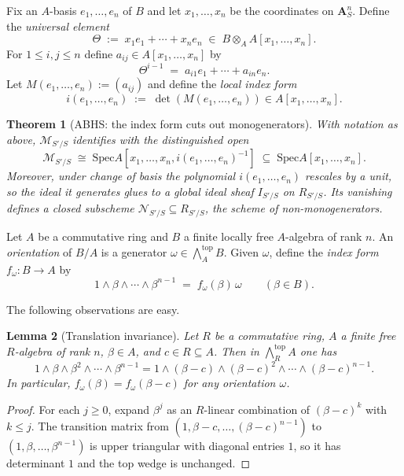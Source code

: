 \documentclass[11pt,letterpaper]{amsart}
\newcommand{\A}{\mathbf{A}}
\newcommand{\Spec}{\mathrm{Spec}}
\newcommand{\wedgeTop}{\bigwedge\nolimits^{\mathrm{top}}}
\newcommand{\cM}{\mathcal{M}}
\newcommand{\cN}{\mathcal{N}}
\theoremstyle{plain}
\newtheorem{theorem}{Theorem}[section]
\newtheorem{lemma}[theorem]{Lemma}
\theoremstyle{definition}
\theoremstyle{remark}
\theoremstyle{plain}
\begin{document}
Fix an $A$-basis $e_1,\dots,e_n$ of $B$ and let $x_1,\dots,x_n$ be the coordinates on $\A^n_S$.
Define the \emph{universal element}
\[
\Theta \;:=\; x_1 e_1 + \cdots + x_n e_n \;\in\; B\otimes_A A[x_1,\dots,x_n].
\]
For $1\le i,j\le n$ define $a_{ij}\in A[x_1,\dots,x_n]$ by
\[
\Theta^{i-1} \;=\; a_{i1}e_1 + \cdots + a_{in}e_n.
\]
Let $M(e_1,\dots,e_n):=(a_{ij})$ and define the \emph{local index form}
\[
i(e_1,\dots,e_n) \;:=\; \det(M(e_1,\dots,e_n)) \in A[x_1,\dots,x_n].
\]

\begin{theorem}[ABHS: the index form cuts out monogenerators]\label{thm:ABHS-index-open}
With notation as above, $\cM_{S'/S}$ identifies with the distinguished open
\[
\cM_{S'/S} \;\cong\; \Spec A[x_1,\dots,x_n, i(e_1,\dots,e_n)^{-1} ] \;\subseteq\; \Spec A[x_1,\dots,x_n].
\]
Moreover, under change of basis the polynomial $i(e_1,\dots,e_n)$ rescales by a unit, so the ideal it
generates glues to a global ideal sheaf $I_{S'/S}$ on $R_{S'/S}$.
Its vanishing defines a closed subscheme $\cN_{S'/S}\subseteq R_{S'/S}$, the \emph{scheme of non-monogenerators}.
\end{theorem}


Let $A$ be a commutative ring and $B$ a finite locally free $A$-algebra of rank $n$.
An \emph{orientation} of $B/A$ is a generator $\omega \in \wedgeTop_A B$.
Given $\omega$, define the \emph{index form} $f_\omega:B\to A$ by
\begin{equation}\label{eq:index-form-algebra}
1\wedge \beta \wedge \cdots \wedge \beta^{n-1} \;=\; f_\omega(\beta)\,\omega \qquad (\beta\in B).
\end{equation}

The following observations are easy.

\begin{lemma}[Translation invariance]\label{lem:translation}
Let $R$ be a commutative ring, $A$ a finite free $R$-algebra of rank $n$, $\beta\in A$, and $c\in R\subseteq A$.
Then in $\wedgeTop_R A$ one has
\[
1\wedge \beta\wedge\beta^2\wedge\cdots\wedge \beta^{n-1}
=
1\wedge (\beta-c)\wedge(\beta-c)^2\wedge\cdots\wedge (\beta-c)^{n-1}.
\]
In particular, $f_\omega(\beta)=f_\omega(\beta-c)$ for any orientation $\omega$.
\end{lemma}

\begin{proof}
For each $j\ge 0$, expand $\beta^j$ as an $R$-linear combination of $(\beta-c)^k$ with $k\le j$.
The transition matrix from $(1,\beta-c,\dots,(\beta-c)^{n-1})$ to $(1,\beta,\dots,\beta^{n-1})$
is upper triangular with diagonal entries $1$, so it has determinant $1$ and the top wedge is unchanged.
\end{proof}
\end{document}
